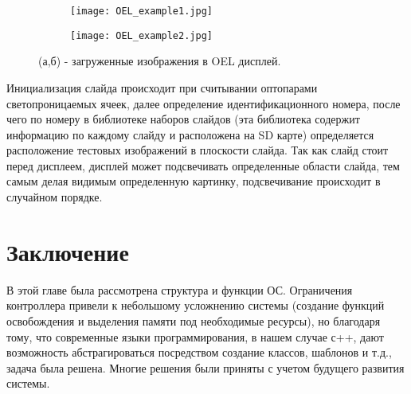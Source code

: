 \begin{figure}[ht]
    \centering
    \begin{subfigure}[b]{0.45\textwidth}
    \centering
        \texttt{[image: OEL\_example1.jpg]}
        \caption{}
    \end{subfigure}
    \begin{subfigure}[b]{0.45\textwidth}
    \centering
        \texttt{[image: OEL\_example2.jpg]}
        \caption{}
    \end{subfigure}
    \caption{ (а,б) - загруженные изображения в OEL дисплей.}
    \label{fig:OELDisplExample}
\end{figure}

Инициализация слайда происходит при считывании оптопарами светопроницаемых ячеек, далее определение идентификационного номера, после чего по номеру в библиотеке наборов слайдов (эта библиотека содержит информацию по каждому слайду и расположена на SD карте) определяется расположение тестовых изображений в плоскости слайда. 
Так как слайд стоит перед дисплеем, дисплей может подсвечивать определенные области слайда, тем самым делая видимым определенную картинку, подсвечивание происходит в случайном порядке.
\section{Заключение}
В этой главе была рассмотрена структура и функции ОС. Ограничения контроллера привели к небольшому усложнению системы (создание функций освобождения и выделения памяти под необходимые ресурсы), но благодаря тому, что современные языки программирования, в нашем случае с++, дают возможность абстрагироваться посредством создание классов, шаблонов и т.д., задача была решена. Многие решения были приняты с учетом будущего развития системы.